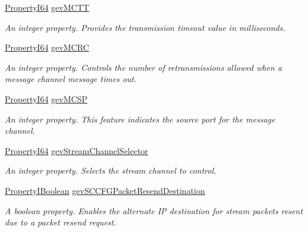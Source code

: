 \begin{DoxyCompactItemize}
\hyperlink{group___common_interface_ga81749b2696755513663492664a18a893}{Property\+I64} \hyperlink{classmv_i_m_p_a_c_t_1_1acquire_1_1_gen_i_cam_1_1_transport_layer_control_a00fccdaf940620bc809d5373b899022d}{gev\+M\+C\+T\+T}
\begin{DoxyCompactList}\small\item\em An integer property. Provides the transmission timeout value in milliseconds. \end{DoxyCompactList}\item 
\hyperlink{group___common_interface_ga81749b2696755513663492664a18a893}{Property\+I64} \hyperlink{classmv_i_m_p_a_c_t_1_1acquire_1_1_gen_i_cam_1_1_transport_layer_control_aae23d62f536f69f299d6d366fd39f27c}{gev\+M\+C\+R\+C}
\begin{DoxyCompactList}\small\item\em An integer property. Controls the number of retransmissions allowed when a message channel message times out. \end{DoxyCompactList}\item 
\hyperlink{group___common_interface_ga81749b2696755513663492664a18a893}{Property\+I64} \hyperlink{classmv_i_m_p_a_c_t_1_1acquire_1_1_gen_i_cam_1_1_transport_layer_control_a11ea36e84353e6a473cfab3e0b81d793}{gev\+M\+C\+S\+P}
\begin{DoxyCompactList}\small\item\em An integer property. This feature indicates the source port for the message channel. \end{DoxyCompactList}\item 
\hyperlink{group___common_interface_ga81749b2696755513663492664a18a893}{Property\+I64} \hyperlink{classmv_i_m_p_a_c_t_1_1acquire_1_1_gen_i_cam_1_1_transport_layer_control_a7e227c7c97a21cfeaa0d8e1a08a0ee3d}{gev\+Stream\+Channel\+Selector}
\begin{DoxyCompactList}\small\item\em An integer property. Selects the stream channel to control. \end{DoxyCompactList}\item 
\hyperlink{group___common_interface_ga44f9437e24b21b6c93da9039ec6786aa}{Property\+I\+Boolean} \hyperlink{classmv_i_m_p_a_c_t_1_1acquire_1_1_gen_i_cam_1_1_transport_layer_control_ace3aea59f2f09120252fa4161685a970}{gev\+S\+C\+C\+F\+G\+Packet\+Resend\+Destination}
\begin{DoxyCompactList}\small\item\em A boolean property. Enables the alternate I\+P destination for stream packets resent due to a packet resend request. \end{DoxyCompactList}\item 

\end{DoxyCompactItemize}
